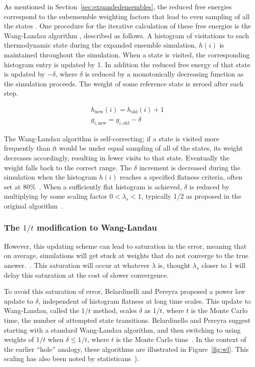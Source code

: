 \documentclass[superscriptaddress,showkeys, nofootinbib, pre, aps]{revtex4-1}
\begin{document}
As mentioned in Section~\ref{sec:expandedensembles}, the reduced free energies correspond to the subensemble weighting factors that lead to even sampling of all the states
\cite{lyubartsev:jcp:1992:expanded-ensembles}.  One procedure for the iterative calculation of these free energies is the Wang-Landau
algorithm \cite{wang-landau:prl:2001:wang-landau}, described as follows.  A histogram of visitations to each thermodynamic state during the expanded ensemble simulation, $h(i)$ is maintained
throughout the simulation.  When a state is visited, the corresponding histogram entry is updated by 1.  In addition the reduced free energy of that state is updated by $-\delta$, where $\delta$ is reduced by a
monotonically decreasing function as the simulation proceeds.  The weight of some reference state is zeroed after each step.

\begin{eqnarray}
h_{\mathrm{new}}(i) = h_{\mathrm{old}}(i) + 1 \\
g_{i,\mathrm{new}} = g_{i,\mathrm{old}} - \delta
\label{eq:wang-landau}
\end{eqnarray}

The Wang-Landau algorithm is self-correcting; if a state is visited more frequently than it would be under equal sampling of all of the states, its weight decreases accordingly, resulting in fewer visits to that state.  Eventually the weight falls back to the correct range.  The $\delta$ increment is decreased during the simulation when the histogram $h(i)$ reaches a specified flatness criteria, often set at 80\%~\cite{wang-landau:prl:2001:wang-landau}.  When a sufficiently flat histogram is achieved, $\delta$ is reduced by multiplying by some scaling factor $0<\lambda_s<1$, typically 1/2 as proposed in the original algorithm~\cite{wang-landau:prl:2001:wang-landau}.

\subsubsection{\label{sec:wl}The $1/t$ modification to Wang-Landau}
However, this updating scheme can lead to saturation in the error, meaning that on average, simulations will get stuck at weights that do not converge to the true answer.~\cite{Belardinelli2008,
  Belardinelli2007}.  This saturation will occur at whatever $\lambda$ is, thought $\lambda_s$ closer to 1 will delay this saturation at the cost of slower convergence.

To avoid this saturation of error, Belardinelli and Pereyra proposed a power law update to $\delta$, independent of histogram flatness at long time scales. This update to Wang-Landau, called the $1/t$ method, scales $\delta$ as $1/t$, where $t$ is the Monte Carlo time, the
number of attempted state transitions.  Belardinello and Pereyra suggest starting with a standard Wang-Landau algorithm, and then switching to using weights of $1/t$ when $\delta \leq 1/t$, where $t$
is the Monte Carlo time~\cite{Belardinelli2008, Belardinelli2007}.  In
the context of the earlier ``hole'' analogy, these algorithms are illustrated in Figure~\ref{fig:wl}.  This scaling has also been noted
by statisticans~\cite{wl_convergence}).
\end{document}

